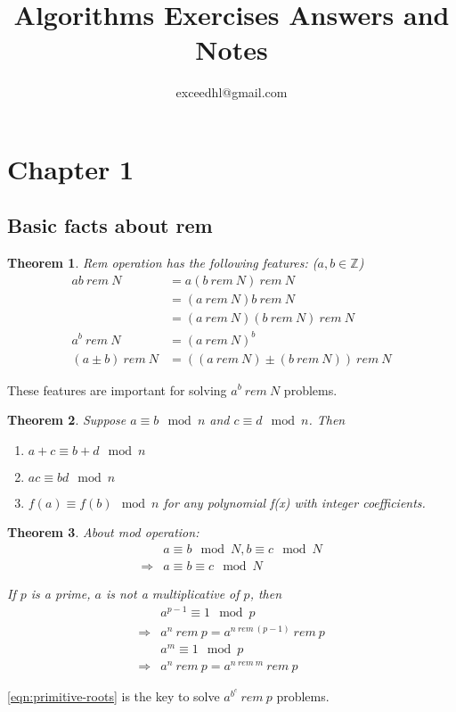 \documentclass[11pt]{article}
\title{Algorithms Exercises Answers and Notes}
\author{exceedhl@gmail.com}
\newtheorem{thm}{Theorem}
\newcommand{\rem}{\ rem\ }
\begin{document}
\maketitle

\section{Chapter 1}

\subsection{Basic facts about rem}

\begin{thm}
  Rem operation has the following features: ($a, b \in \mathbb{Z}$)
  \begin{align}
    ab \rem N & = a(b \rem N) \rem N \\
    & = (a \rem N)b \rem N \\
    & = (a \rem N)(b \rem N) \rem N \\
    a^b \rem N & = (a \rem N)^b \\
    (a \pm b) \rem N & = ((a \rem N ) \pm (b \rem N)) \rem N
  \end{align}
\end{thm}
These features are important for solving $a^b \rem N$ problems.

\begin{thm}
  Suppose $a \equiv b \mod n$ and $c \equiv d \mod n$. Then 
  \begin{enumerate}
  \item $a+c \equiv b+d \mod n$
  \item $ac \equiv bd \mod n$
  \item $f(a) \equiv f(b) \mod n$ for any polynomial f(x) with integer coefficients.
  \end{enumerate}
\end{thm}

\begin{thm}
  About mod operation:
  \begin{align}
    & a \equiv b \mod N, b \equiv c \mod N \\
    \Rightarrow & a \equiv b \equiv c \mod N
  \end{align}

  If $p$ is a prime, $a$ is not a multiplicative of $p$, then 
  \begin{align}
    & a^{p-1} \equiv 1 \mod p \\
    \Rightarrow & a^n \rem p = a^{n \rem (p-1)} \rem p \label{eqn:primitive-roots}\\
    & a^m \equiv 1 \mod p \\
    \Rightarrow & a^n \rem p = a^{n \rem m} \rem p
  \end{align}
\end{thm}
\eqref{eqn:primitive-roots} is the key to solve $a^{b^c} \rem p$
problems. 
\end{document}
